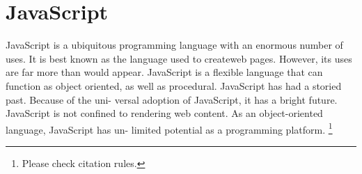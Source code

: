 \section{JavaScript}


JavaScript is a ubiquitous programming language with an
enormous number of uses. It is best known as the language
used to createweb pages. \cite{hid-sp18-525-java} However, its 
uses are far more than would appear. JavaScript is a flexible 
language that can function as object oriented, as well as 
procedural. \cite{hid-sp18-525-java} JavaScript has had a storied 
past. \cite{hid-sp18-525-java} Because of the uni- versal adoption 
of JavaScript, it has a bright future. JavaScript is not 
confined to rendering web content. As an object-oriented 
language, JavaScript has un- limited potential as a 
programming platform. \cite{hid-sp18-525-java}\footnote{Please check citation rules.}
